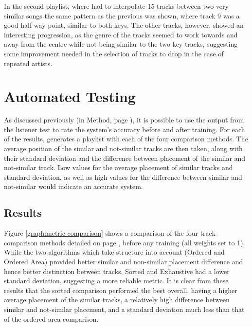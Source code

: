 In the second playlist, where  had to interpolate 15 tracks between two very similar songs the same pattern as the previous was shown, where track 9 was a good half-way point, similar to both keys. The other tracks, however, showed an interesting progression, as the genre of the tracks seemed to work towards and away from the centre while not being similar to the two key tracks, suggesting some improvement needed in the selection of tracks to drop in the case of repeated artists.
\pagebreak
\section{Automated Testing}
As discussed previously (in Method, page \pageref{text:method:weight_optimisation}), it is possible to use the output from the listener test to rate the system's accuracy before and after training. For each of the results,  generates a playlist with each of the four comparison methods. The average position of the similar and not-similar tracks are then taken, along with their standard deviation and the difference between placement of the similar and not-similar track. Low values for the average placement of similar tracks and standard deviation, as well as high values for the difference between similar and not-similar would indicate an accurate system.
\subsection{Results}
Figure \ref{graph:metric-comparison} shows a comparison of the four track comparison methods detailed on page \pageref{text:method:comparison_methods}, before any training (all weights set to 1). While the two algorithms which take structure into account (Ordered and Ordered Area) provided better similar and non-similar placement difference and hence better distinction between tracks, Sorted and Exhaustive had a lower standard deviation, suggesting a more reliable metric. It is clear from these results that the sorted comparison performed the best overall, having a higher average placement of the similar tracks, a relatively high difference between similar and not-similar placement, and a standard deviation much less than that of the ordered area comparison.

